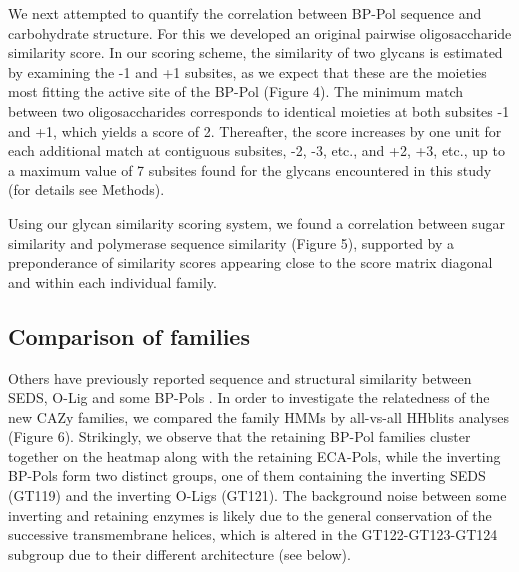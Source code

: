 \documentclass{article}
\begin{document}
We next attempted to quantify the correlation between BP-Pol sequence and carbohydrate structure. For this we developed an original pairwise oligosaccharide similarity score. In our scoring scheme, the similarity of two glycans is estimated by examining the -1 and +1 subsites, as we expect that these are the moieties most fitting the active site of the BP-Pol (Figure 4). 
The minimum match between two oligosaccharides corresponds to identical moieties at both subsites -1 and +1, which yields a score of 2. Thereafter, the score increases by one unit for each additional match at contiguous subsites, -2, -3, etc., and +2, +3, etc., up to a maximum value of 7 subsites found for the glycans encountered in this study (for details see Methods).

Using our glycan similarity scoring system, we found a correlation between sugar similarity and polymerase sequence similarity (Figure 5), supported by a preponderance of similarity scores appearing close to the score matrix diagonal and within each individual family.

\subsection{Comparison of families}
Others have previously reported sequence and structural similarity between SEDS, O-Lig and some BP-Pols \cite{nygaard_structural_2023, meeske_seds_2016, ashraf_structural_2022, alexander_emerging_2023}. In order to investigate the relatedness of the new CAZy families, we compared the family HMMs by all-vs-all HHblits analyses \cite{remmert_hhblits_2012} (Figure 6). Strikingly, we observe that the retaining BP-Pol families cluster together on the heatmap along with the retaining ECA-Pols, while the inverting BP-Pols form two distinct groups, one of them containing the inverting SEDS (GT119) and the inverting O-Ligs (GT121). The background noise between some inverting and retaining enzymes is likely due to the general conservation of the successive transmembrane helices, which is altered in the GT122-GT123-GT124 subgroup due to their different architecture (see below).
\end{document}
